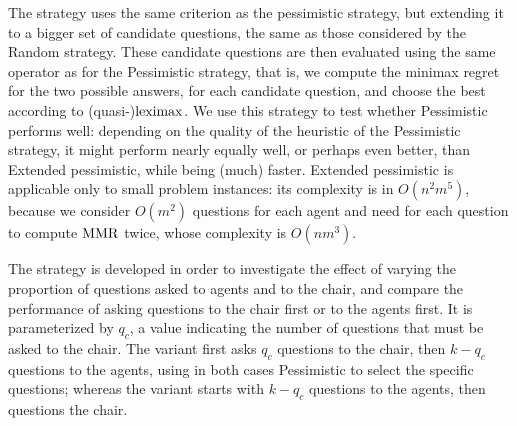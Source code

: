 \documentclass[sigconf, anonymous]{aamas}
\begin{document}
The  strategy uses the same criterion as the pessimistic strategy, but extending it to a bigger set of candidate questions, the same as those considered by the Random strategy.
These candidate questions are then evaluated using the same operator as for the Pessimistic strategy, that is, we compute the minimax regret for the two possible answers, for each candidate question, and choose the best according to (quasi-)$\operatorname{leximax}$.
We use this strategy to test whether Pessimistic performs well: depending on the quality of the heuristic of the Pessimistic strategy, it might perform nearly equally well, or perhaps even better, than Extended pessimistic, while being (much) faster. Extended pessimistic is applicable only to small problem instances: its complexity is in $O(n^2 m^5)$, because we consider $O(m^2)$ questions for each agent and need for each question to compute $\operatorname{MMR}$ twice, whose complexity is $O(nm^3)$.

The  strategy is developed in order to investigate the effect of varying the proportion of questions asked to agents and to the chair, and compare the performance of asking questions to the chair first or to the agents first. It is parameterized by $q_c$, a value indicating the number of questions that must be asked to the chair.
The  variant first asks $q_c$ questions to the chair, then $k - q_c$ questions to the agents, using in both cases Pessimistic to select the specific questions; whereas the  variant starts with $k - q_c$ questions to the agents, then questions the chair. 
\end{document}
